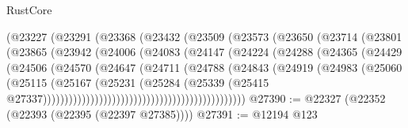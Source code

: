 \begin{lexlean}{RustCore}
\begin{coremodule}
                                (@23227
                                  (@23291
                                    (@23368
                                      (@23432
                                        (@23509
                                          (@23573
                                            (@23650
                                              (@23714
                                                (@23801
                                                  (@23865
                                                    (@23942
                                                      (@24006
                                                        (@24083
                                                          (@24147
                                                            (@24224
                                                              (@24288
                                                                (@24365
                                                                  (@24429
                                                                    (@24506
                                                                      (@24570
                                                                        (@24647
                                                                          (@24711
                                                                            (@24788
                                                                              (@24843
                                                                                (@24919
                                                                                  (@24983
                                                                                    (@25060
                                                                                      (@25115
                                                                                        (@25167
                                                                                          (@25231
                                                                                            (@25284
                                                                                              (@25339
                                                                                                (@25415
                                                                                                  @27337)))))))))))))))))))))))))))))))))))))))))))))))
@27390 := @22327 (@22352 (@22393 (@22395 (@22397 @27385))))
@27391 := @12194 @123

\end{coremodule}
\end{lexlean}
